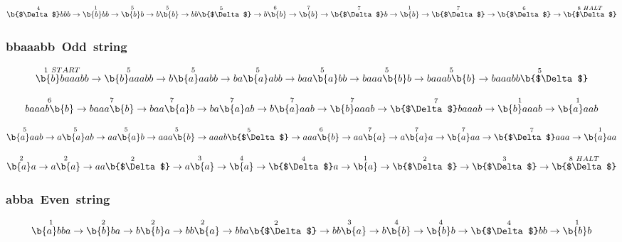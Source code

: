 \documentclass[12pt]{article}
\begin{document}
\[
\overset{4}{\b{$\Delta$}bbb}\rightarrow
\overset{1}{\b{b}bb}\rightarrow
\overset{5}{\b{b}b}\rightarrow
 \overset{5}{b\b{b}}\rightarrow
\overset{5}{bb\b{$\Delta$}}\rightarrow
\overset{6}{b\b{b}}\rightarrow
\overset{7}{\b{b}}\rightarrow
\overset{7}{\b{$\Delta$}b}\rightarrow
\overset{1}{\b{b}}\rightarrow
\overset{7}{\b{$\Delta$}}\rightarrow
\overset{6}{\b{$\Delta$}}\rightarrow
\overset{8~HALT}{\b{$\Delta$}}
\]
\subsubsection{bbaaabb~Odd~string}
\[
\overset{1~START}{\b{b}baaabb}\rightarrow
\overset{5}{\b{b}aaabb}\rightarrow
\overset{5}{b\b{a}aabb}\rightarrow
\overset{5}{ba\b{a}abb}\rightarrow
\overset{5}{baa\b{a}bb}\rightarrow
\overset{5}{baaa\b{b}b}\rightarrow
\overset{5}{baaab\b{b}}\rightarrow
\overset{5}{baaabb\b{$\Delta$} }\]

\[
\overset{6}{baaab\b{b}}\rightarrow
\overset{7}{baaa\b{b}}\rightarrow
\overset{7}{baa\b{a}b}\rightarrow
\overset{7}{ba\b{a}ab}\rightarrow
\overset{7}{b\b{a}aab}\rightarrow
\overset{7}{\b{b}aaab}\rightarrow
\overset{7}{\b{$\Delta$}baaab}\rightarrow
\overset{1}{\b{b}aaab}\rightarrow
\overset{1}{\b{a}aab}
\]

\[
\overset{5}{\b{a}aab}\rightarrow
\overset{5}{a\b{a}ab}\rightarrow
\overset{5}{aa\b{a}b}\rightarrow
\overset{5}{aaa\b{b}}\rightarrow
\overset{5}{aaab\b{$\Delta$}}\rightarrow
\overset{6}{aaa\b{b}}\rightarrow
\overset{7}{aa\b{a}}\rightarrow
\overset{7}{a\b{a}a}\rightarrow
\overset{7}{\b{a}aa}\rightarrow
\overset{7}{\b{$\Delta$}aaa}\rightarrow
\overset{1}{\b{a}aa}
\]

\[
\overset{2}{\b{a}a}\rightarrow
\overset{2}{a\b{a}}\rightarrow
\overset{2}{aa\b{$\Delta$}}\rightarrow
\overset{3}{a\b{a}}\rightarrow
\overset{4}{\b{a}}\rightarrow
\overset{4}{\b{$\Delta$}a}\rightarrow
\overset{1}{\b{a}}\rightarrow
\overset{2}{\b{$\Delta$}}\rightarrow
\overset{3}{\b{$\Delta$}}\rightarrow
\overset{8~HALT}{\b{$\Delta$}}
\]

\subsubsection{abba~Even~string}

\[
\overset{1}{\b{a}bba}\rightarrow
\overset{2}{\b{b}ba}\rightarrow
\overset{2}{b\b{b}a}\rightarrow
\overset{2}{bb\b{a}}\rightarrow
\overset{2}{bba\b{$\Delta$}}\rightarrow
\overset{3}{bb\b{a}}\rightarrow
\overset{4}{b\b{b}}\rightarrow
\overset{4}{\b{b}b}\rightarrow
\overset{4}{\b{$\Delta$}bb}\rightarrow
\overset{1}{\b{b}b}
\]
\end{document}
